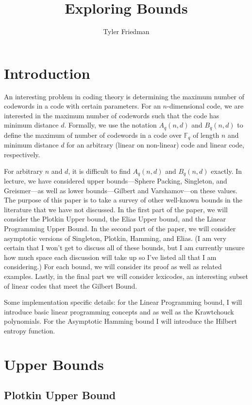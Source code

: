 \documentclass{article}
\title{Exploring Bounds}
\author{Tyler Friedman}
\numberwithin{theorem}{subsection}
\begin{document}
\maketitle

\section{Introduction}

An interesting problem in coding theory is determining the maximum
number of codewords in a code with certain parameters.  For an $n$-dimensional code, we are interested in 
the maximum number of codewords such that the code has minimum distance $d$.  
Formally, we use the notation $A_q(n,d)$
and $B_q(n,d)$ to define the maximum of number of codewords in a code over
$\mathbb{F}_q$ of length $n$ and minimum distance $d$ for an arbitrary (linear
on non-linear) code and linear code, respectively.  

For arbitrary $n$ and $d$, it is difficult to find $A_q(n,d)$ and $B_q(n,d)$ exactly.
 In lecture, we have considered upper bounds---Sphere Packing, Singleton, and Greismer---as well as
lower bounds---Gilbert and Varshamov---on these values.  The purpose of this
paper is to take a survey of other well-known bounds in the literature that we have not discussed.  
In the first part of the paper, we will consider the Plotkin Upper bound, 
the Elias Upper bound, and the Linear Programming Upper Bound.  In the second part of the paper, we will consider asymptotic versions
of Singleton, Plotkin, Hamming, and Elias.  (I am very certain that I won't get to discuss all of these bounds, but I am currently unsure how much space each discussion will take up so I've
listed all that I am considering.)  For each bound, we will consider its proof as well
as related examples.  Lastly, in the final part we will consider lexicodes, an interesting subset of linear codes that meet the Gilbert Bound.

Some implementation specific details: for the Linear Programming bound, I will introduce basic linear programming concepts and as well as the Krawtchouck polynomials.  For the 
Asymptotic Hamming bound I will introduce the Hilbert entropy function.  


\section{Upper Bounds}

\subsection{Plotkin Upper Bound}
\end{document}
